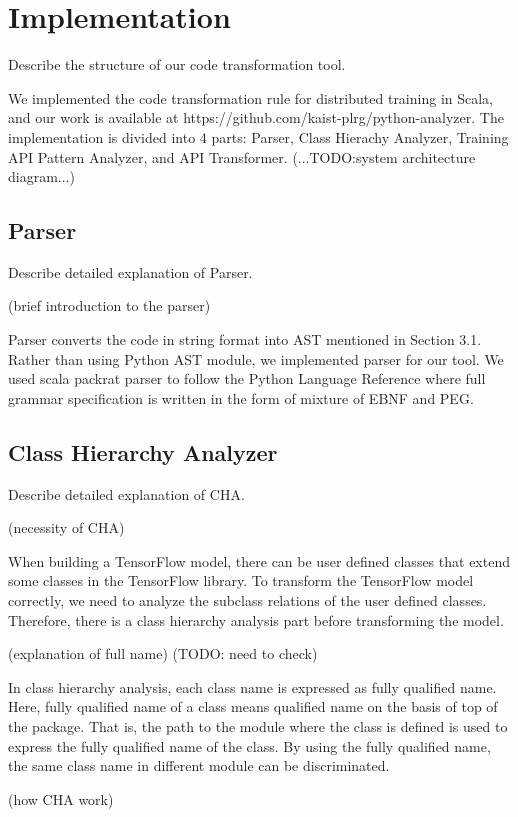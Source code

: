 \section{Implementation}\label{sec:impl}
Describe the structure of our code transformation tool.

We implemented the code transformation rule for distributed training in Scala,
and our work is available at https://github.com/kaist-plrg/python-analyzer.
The implementation is divided into 4 parts:
Parser, Class Hierachy Analyzer, Training API Pattern Analyzer, and API Transformer.
(...TODO:system architecture diagram...)

\subsection{Parser}
Describe detailed explanation of Parser.

(brief introduction to the parser)

Parser converts the code in string format into AST mentioned in Section 3.1.
Rather than using Python AST module, we implemented parser for our tool.
We used scala packrat parser to follow the Python Language Reference
where full grammar specification is written in the form of mixture of EBNF and PEG.

\subsection{Class Hierarchy Analyzer}
Describe detailed explanation of CHA.

(necessity of CHA)

When building a TensorFlow model, there can be user defined classes
that extend some classes in the TensorFlow library.
To transform the TensorFlow model correctly,
we need to analyze the subclass relations of the user defined classes.
Therefore, there is a class hierarchy analysis part
before transforming the model.

(explanation of full name)
(TODO: need to check)

In class hierarchy analysis, each class name is expressed as fully qualified name.
Here, fully qualified name of a class means qualified name\cite{???}
on the basis of top of the package.
That is, the path to the module where the class is defined
is used to express the fully qualified name of the class.
By using the fully qualified name, the same class name in different module
can be discriminated.

(how CHA work)

